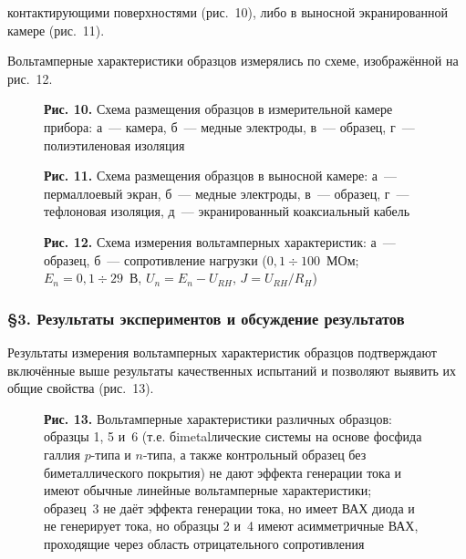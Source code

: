 \documentclass[12pt,a4paper]{article}
\begin{document}
\newpage

контактирующими поверхностями (рис.~10), либо в выносной экранированной камере
(рис.~11).

Вольтамперные характеристики образцов измерялись по схеме, изображённой на
рис.~12.

\begin{figure}[h]
\centering
\caption*{\textbf{Рис. 10.} Схема размещения образцов в измерительной камере
прибора: а~— камера, б~— медные электроды, в~— образец, г~— полиэтиленовая
изоляция}
\end{figure}

\begin{figure}[h]
\centering
\caption*{\textbf{Рис. 11.} Схема размещения образцов в выносной камере:
а~— пермаллоевый экран, б~— медные электроды, в~— образец, г~— тефлоновая
изоляция, д~— экранированный коаксиальный кабель}
\end{figure}

\begin{figure}[h]
\centering
\caption*{\textbf{Рис. 12.} Схема измерения вольтамперных характеристик:
а~— образец, б~— сопротивление нагрузки ($0{,}1 \div 100$~МОм;
$E_n = 0{,}1 \div 29$~В, $U_n = E_n - U_{RH}$, $J = U_{RH}/R_H$)}
\end{figure}

\subsubsection*{§3. Результаты экспериментов и обсуждение результатов}

Результаты измерения вольтамперных характеристик образцов подтверждают
включённые выше результаты качественных испытаний и позволяют выявить их общие
свойства (рис.~13).

\begin{figure}[h]
\centering
\caption*{\textbf{Рис. 13.} Вольтамперные характеристики различных образцов:
образцы 1, 5 и~6 (т.е. бimetalлические системы на основе фосфида галлия $p$-типа
и $n$-типа, а также контрольный образец без биметаллического покрытия) не дают
эффекта генерации тока и имеют обычные линейные вольтамперные характеристики;
образец~3 не даёт эффекта генерации тока, но имеет ВАХ диода и не генерирует
тока, но образцы 2 и~4 имеют асимметричные ВАХ, проходящие через область
отрицательного сопротивления}
\end{figure}
\end{document}

